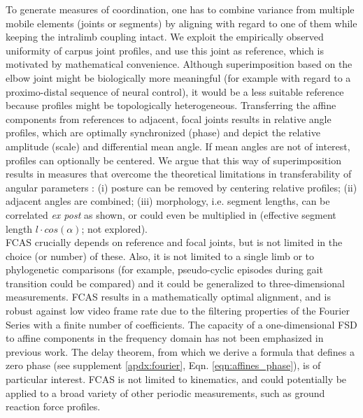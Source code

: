 To generate measures of coordination, one has to combine variance from multiple mobile elements (joints or segments) by aligning with regard to one of them while keeping the intralimb coupling intact.
We exploit the empirically observed uniformity of carpus joint profiles, and use this joint as reference, which is motivated by mathematical convenience.
Although superimposition based on the elbow joint might be biologically more meaningful (for example with regard to a proximo-distal sequence of neural control), it would be a less suitable reference because profiles might be topologically heterogeneous.
Transferring the affine components from references to adjacent, focal joints results in relative  angle profiles, which are optimally synchronized (phase) and depict the relative amplitude (scale) and differential mean  angle.
If mean  angles are not of interest, profiles can optionally be centered.
We argue that this way of superimposition results in measures that overcome the theoretical limitations in transferability of angular parameters \citep{Gatesy2011}: (i) posture can be removed by centering relative profiles; (ii) adjacent  angles are combined; (iii) morphology, i.e. segment lengths, can be correlated \textit{ex post} as shown, or could even be multiplied in (effective segment length $l\cdot cos\left(\alpha\right)$; not explored).
\\FCAS crucially depends on reference and focal joints, but is not limited in the choice (or number) of these.
Also, it is not limited to a single limb or to phylogenetic comparisons (for example, pseudo-cyclic episodes during gait transition could be compared) and it could be generalized to three-dimensional measurements.
FCAS results in a mathematically optimal alignment, and is robust against low video frame rate due to the filtering properties of the Fourier Series with a finite number of coefficients.
The capacity of a one-dimensional FSD to  affine components in the frequency domain has not been emphasized in previous work.
The delay theorem, from which we derive a formula that defines a zero phase (see supplement \ref*{apdx:fourier}, Eqn. \ref*{eqn:affines_phase}), is of particular interest.
FCAS is not limited to kinematics, and could potentially be applied to a broad variety of other periodic measurements, such as ground reaction force profiles.


